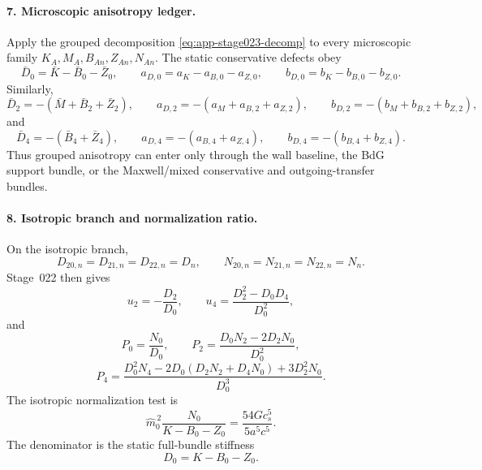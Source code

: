 \paragraph{7. Microscopic anisotropy ledger.}
Apply the grouped decomposition \eqref{eq:app-stage023-decomp} to every microscopic family \(K_A,M_A,B_{An},Z_{An},N_{An}\).  The static conservative defects obey
\begin{equation}
\label{eq:app-stage023-d0-defects}
\bar D_0=\bar K-\bar B_0-\bar Z_0,
\qquad
a_{D,0}=a_K-a_{B,0}-a_{Z,0},
\qquad
b_{D,0}=b_K-b_{B,0}-b_{Z,0}.
\end{equation}
Similarly,
\begin{equation}
\label{eq:app-stage023-d2-defects}
\bar D_2=-(\bar M+\bar B_2+\bar Z_2),
\qquad
a_{D,2}=-(a_M+a_{B,2}+a_{Z,2}),
\qquad
b_{D,2}=-(b_M+b_{B,2}+b_{Z,2}),
\end{equation}
and
\begin{equation}
\label{eq:app-stage023-d4-defects}
\bar D_4=-(\bar B_4+\bar Z_4),
\qquad
a_{D,4}=-(a_{B,4}+a_{Z,4}),
\qquad
b_{D,4}=-(b_{B,4}+b_{Z,4}).
\end{equation}
Thus grouped anisotropy can enter only through the wall baseline, the BdG support bundle, or the Maxwell/mixed conservative and outgoing-transfer bundles.

\paragraph{8. Isotropic branch and normalization ratio.}
On the isotropic branch,
\begin{equation}
D_{20,n}=D_{21,n}=D_{22,n}=D_n,
\qquad
N_{20,n}=N_{21,n}=N_{22,n}=N_n.
\end{equation}
Stage~022 then gives
\begin{equation}
\label{eq:app-stage023-isotropic-response}
u_2=-\frac{D_2}{D_0},
\qquad
u_4=\frac{D_2^2-D_0D_4}{D_0^2},
\end{equation}
and
\begin{equation}
\label{eq:app-stage023-isotropic-pref}
P_0=\frac{N_0}{D_0},
\qquad
P_2=\frac{D_0N_2-2D_2N_0}{D_0^2},
\end{equation}
\begin{equation}
\label{eq:app-stage023-isotropic-p4}
P_4=\frac{D_0^2N_4-2D_0(D_2N_2+D_4N_0)+3D_2^2N_0}{D_0^3}.
\end{equation}
The isotropic normalization test is
\begin{equation}
\label{eq:app-stage023-normalization-test}
\boxed{
\widehat m_0^{\,2}\frac{N_0}{K-B_0-Z_0}
=\frac{54Gc_s^5}{5a^5c^5}}.
\end{equation}
The denominator is the static full-bundle stiffness
\begin{equation}
D_0=K-B_0-Z_0.
\end{equation}

